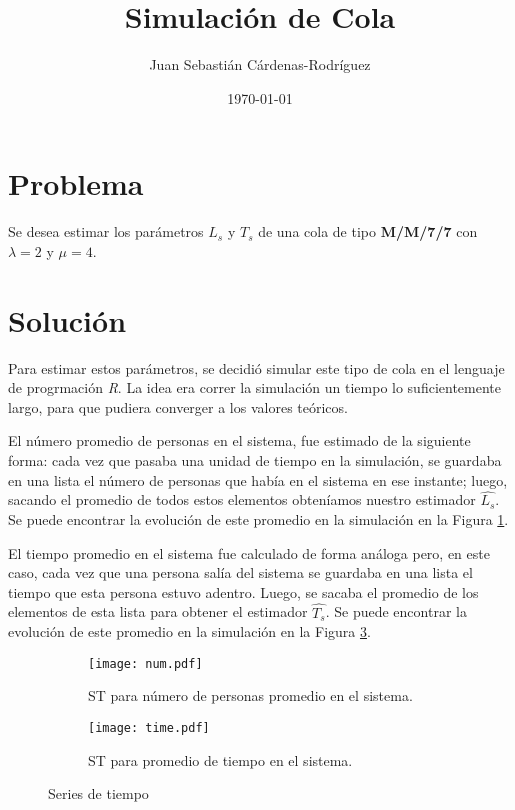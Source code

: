 \documentclass[11pt]{article}
\title{Simulación de Cola}
\author{Juan Sebasti\'an C\'ardenas-Rodríguez \\ \scalebox{0.7}{Ingeniería Matemática, Universidad EAFIT}}
\date{\today}
\theoremstyle{definition}
\theoremstyle{remark}
\theoremstyle{remark}
\begin{document}
\maketitle

\section{Problema}
Se desea estimar los parámetros $L_s$ y $T_s$ de una cola de tipo
\textbf{M/M/7/7} con $\lambda=2$ y $\mu = 4$.

\section{Solución}
Para estimar estos parámetros, se decidió simular este tipo de cola
en el lenguaje de progrmación \textit{R}. La idea era correr la
simulación un tiempo lo suficientemente largo, para que pudiera
converger a los valores teóricos.

El número promedio de personas en el sistema, fue estimado de la
siguiente forma: cada vez que pasaba una unidad de tiempo en la
simulación, se guardaba en una lista el número de personas que había
en el sistema en ese instante; luego, sacando el promedio de todos
estos elementos obteníamos nuestro estimador $\hat{L_s}$. Se puede
encontrar la evolución de este promedio en la simulación en la Figura
\ref{fig:num}.

El tiempo promedio en el sistema fue calculado de forma análoga pero, en este caso, cada vez que una persona salía del sistema se guardaba en una lista el tiempo que esta persona estuvo adentro. Luego, se sacaba el promedio de los elementos de esta lista para obtener el estimador $\hat{T_s}$. Se puede encontrar la evolución de este promedio en la simulación en la Figura \ref{fig:time}.


\begin{figure}[h]
  \centering
  \begin{subfigure}[t]{0.4\textwidth}
    \texttt{[image: num.pdf]}
    \caption{ST para número de personas promedio en el sistema.}
    \label{fig:num}
  \end{subfigure}
  \begin{subfigure}[t]{0.4\textwidth}
    \texttt{[image: time.pdf]}
    \caption{ST para promedio de tiempo en el sistema.}
    \label{fig:time}
  \end{subfigure}
  \caption{Series de tiempo}
\end{figure}
\end{document}
